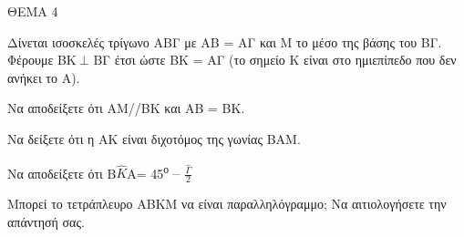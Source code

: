 
ΘΕΜΑ 4

Δίνεται ισοσκελές τρίγωνο ΑΒΓ με ΑΒ = ΑΓ και Μ το μέσο της βάσης του ΒΓ. Φέρουμε ΒΚ$\ \bot$ ΒΓ έτσι ώστε ΒΚ = ΑΓ (το σημείο Κ είναι στο ημιεπίπεδο που δεν ανήκει το Α).

\begin{alist}
\item Να αποδείξετε ότι ΑΜ//ΒΚ και ΑΒ = ΒΚ. 

\item Να δείξετε ότι η ΑΚ είναι διχοτόμος της γωνίας ΒΑΜ. 

\item Να αποδείξετε ότι B$\widehat{Κ}$A= 45\textsuperscript{ο \_} $\frac{\widehat{\Gamma}}{2}$ 

\item Μπορεί το τετράπλευρο ΑΒΚΜ να είναι παραλληλόγραμμο; Να αιτιολογήσετε την απάντησή σας. 
\end{alist}
